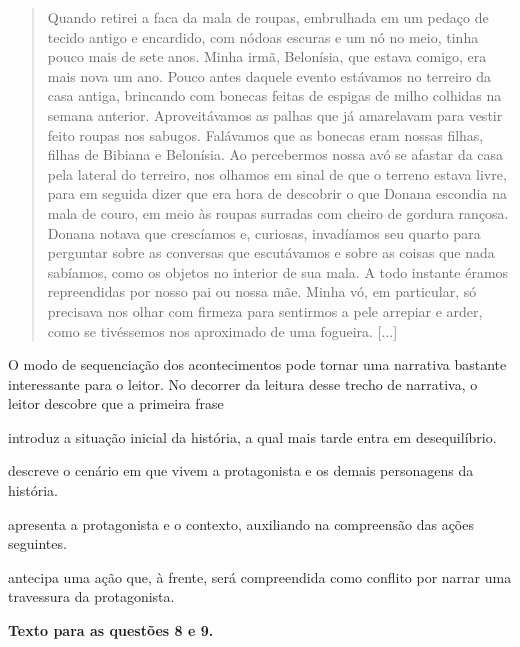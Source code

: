 \begin{quote}
Quando retirei a faca da mala de roupas, embrulhada em um pedaço de
tecido antigo e encardido, com nódoas escuras e um nó no meio, tinha
pouco mais de sete anos. Minha irmã, Belonísia, que estava comigo, era
mais nova um ano. Pouco antes daquele evento estávamos no terreiro da
casa antiga, brincando com bonecas feitas de espigas de milho colhidas
na semana anterior. Aproveitávamos as palhas que já amarelavam para
vestir feito roupas nos sabugos. Falávamos que as bonecas eram nossas
filhas, filhas de Bibiana e Belonísia. Ao percebermos nossa avó se
afastar da casa pela lateral do terreiro, nos olhamos em sinal de que o
terreno estava livre, para em seguida dizer que era hora de descobrir o
que Donana escondia na mala de couro, em meio às roupas surradas com
cheiro de gordura rançosa. Donana notava que crescíamos e, curiosas,
invadíamos seu quarto para perguntar sobre as conversas que escutávamos
e sobre as coisas que nada sabíamos, como os objetos no interior de sua
mala. A todo instante éramos repreendidas por nosso pai ou nossa mãe.
Minha vó, em particular, só precisava nos olhar com firmeza para
sentirmos a pele arrepiar e arder, como se tivéssemos nos aproximado de
uma fogueira. {[}...{]}
\end{quote}


O modo de sequenciação dos acontecimentos pode tornar uma narrativa
bastante interessante para o leitor. No decorrer da leitura desse trecho
de narrativa, o leitor descobre que a primeira frase

\begin{escolha}
\item introduz a situação inicial da história, a qual mais tarde entra em
desequilíbrio.

\item descreve o cenário em que vivem a protagonista e os demais
personagens da história.

\item apresenta a protagonista e o contexto, auxiliando na compreensão das
ações seguintes.

\item antecipa uma ação que, à frente, será compreendida como conflito por
narrar uma travessura da protagonista.
\end{escolha}

\textbf{Texto para as questões 8 e 9.}

